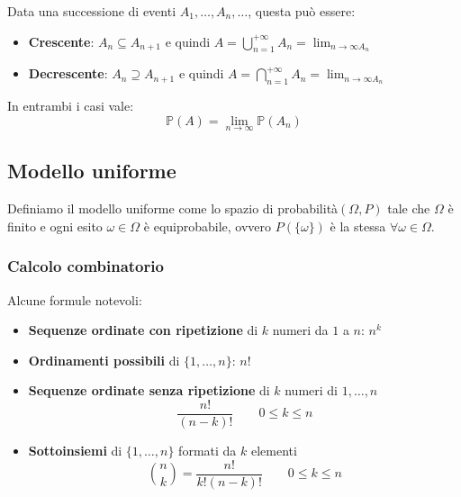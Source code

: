 \begin{proposition}
	Data una successione di eventi $A_1, \ldots, A_n, \ldots$, questa può essere:
	\begin{itemize}
		\item \textbf{Crescente}: $A_n \subseteq A_{n+1}$ e quindi $A = \bigcup_{n=1}^{+\infty}A_n = \lim_{n \to  \infty A_n}$
		\item \textbf{Decrescente}: $A_n  \supseteq A_{n+1}$ e quindi $A = \bigcap_{n=1}^{+\infty}A_n = \lim_{n \to  \infty A_n}$
	\end{itemize}
	In entrambi i casi vale:
	\begin{equation}
		\mathbb{P}(A) = \lim_{n \to \infty}\mathbb{P}(A_n)
	\end{equation}
\end{proposition}

\subsection{Modello uniforme}
\begin{definition}
	Definiamo il modello uniforme come lo spazio di probabilità$ (\Omega,P)$ tale che $\Omega$ è finito e ogni esito $\omega\in\Omega$ è equiprobabile, ovvero $P(\{\omega\})$ è la stessa $\forall \omega \in \Omega$.
\end{definition}

\subsubsection{Calcolo combinatorio}
Alcune formule notevoli:
\begin{itemize}
	\item \textbf{Sequenze ordinate con ripetizione} di $k$ numeri da $1$ a $n$: $n^k$
	\item  \textbf{Ordinamenti possibili} di $\{1, \ldots, n\}$: $n!$
	\item \textbf{Sequenze ordinate senza ripetizione} di $k$ numeri di $1, \ldots, n$
	\begin{equation*}
		\frac{n!}{(n-k)!} \quad\quad 0 \leq k \leq n
	\end{equation*}
	\item \textbf{Sottoinsiemi} di $\{1, \ldots, n\}$ formati da $k$ elementi
	\begin{equation*}
		\binom{n}{k} = \frac{n!}{k!(n-k)!} \quad\quad 0 \leq k \leq n
	\end{equation*}
\end{itemize}

